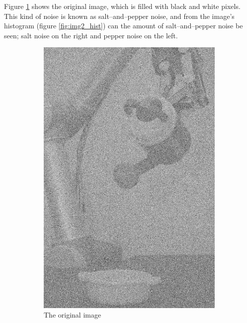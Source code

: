 Figure \ref{fig:img2_src} shows the original image, which is filled with black and white pixels. This kind of noise is known as salt--and--pepper noise, and from the image's histogram (figure \ref{fig:img2_hist}) can the amount of salt--and--pepper noise be seen; salt noise on the right and pepper noise on the left. 
\begin{figure}[H]
    \centering
    \begin{subfigure}[b]{0.23\textwidth}
        \includegraphics[width=\textwidth]{img2/src.png}
        \caption{The original image}
        \label{fig:img2_src}
    \end{subfigure}
    \begin{subfigure}[b]{0.446\textwidth}

\end{subfigure}
\end{figure}
